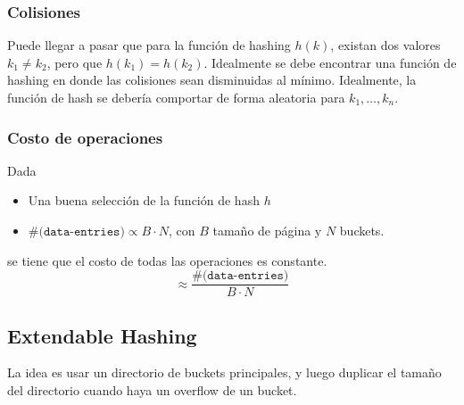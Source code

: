 \subsubsection{Colisiones}
Puede llegar a pasar que para la función de hashing $h(k)$, existan dos valores $k_1 \not= k_2$, pero que $h(k_1) = h(k_2)$. Idealmente se debe encontrar una función de hashing en donde las colisiones sean disminuidas al mínimo. Idealmente, la función de hash se debería comportar de forma aleatoria para $k_1, \ldots, k_n$.

\subsubsection{Costo de operaciones}
Dada
\begin{itemize}
  \item Una buena selección de la función de hash $h$
  \item $\texttt{\#(data-entries)} \propto B \cdot N$, con $B$ tamaño de página y $N$ buckets.
\end{itemize}
se tiene que el costo de todas las operaciones es constante.
\[ \approx \frac{\texttt{\#(data-entries)}}{B \cdot N} \]

\subsection{Extendable Hashing}
La idea es usar un directorio de buckets principales, y luego duplicar el tamaño del directorio cuando haya un overflow de un bucket.

